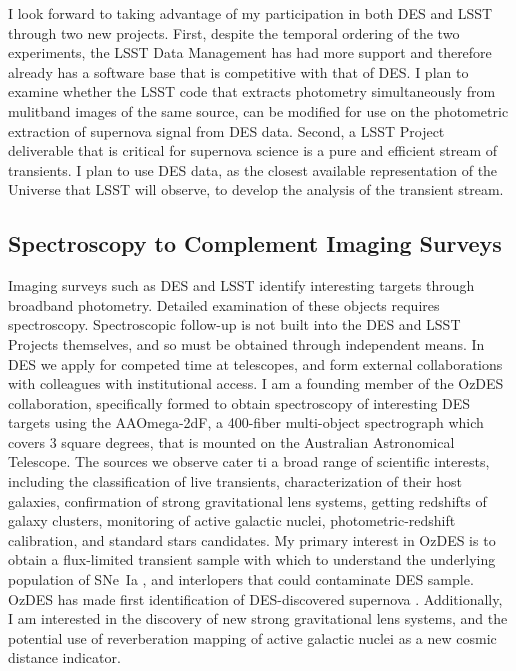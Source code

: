 \documentclass{article}
\begin{document}
I look forward to taking advantage of my participation in both DES and LSST through two new projects.
First, despite the temporal ordering of the two experiments, the LSST Data Management has had more support and therefore
already has a software base that is competitive with that of DES.  I plan to examine whether the LSST code that extracts photometry simultaneously from mulitband images
of the same source, can be modified for use on the photometric extraction of supernova signal from DES data.
Second, a LSST Project deliverable that is critical for supernova science is a pure and efficient stream of transients.
I plan to use
DES data, as the closest available representation of the Universe that LSST will observe, to develop the 
analysis of the transient stream.


\subsection{Spectroscopy to Complement Imaging Surveys}
Imaging surveys such as DES and LSST identify interesting targets through broadband photometry.
Detailed examination of these objects requires spectroscopy. Spectroscopic follow-up is not
built into the DES and LSST Projects themselves, and so must be obtained through independent means.
In DES we apply for competed time at
telescopes, and form external collaborations with colleagues with institutional access.  I am a founding member of the OzDES collaboration, specifically formed to obtain spectroscopy
of interesting DES targets using the AAOmega-2dF, a 400-fiber multi-object spectrograph which covers
3 square degrees, that is mounted on the Australian Astronomical Telescope.
The sources we observe cater ti a broad range of scientific interests,
including the classification of live transients, characterization of their host galaxies, confirmation
of strong gravitational lens systems, getting redshifts of galaxy clusters, monitoring of active galactic nuclei, photometric-redshift
calibration,
and
standard stars candidates.  My primary interest in OzDES is to obtain a flux-limited transient sample with which to understand the
underlying population of SNe~Ia  \cite{2006MNRAS.370..933J}, and interlopers that could contaminate DES sample.  OzDES has made first identification of DES-discovered supernova \cite{2013ATel.5568....1C}.
Additionally, I am interested in the discovery of new strong gravitational lens systems, and the potential use
of reverberation mapping of active galactic nuclei as a new cosmic distance indicator.
\end{document}
